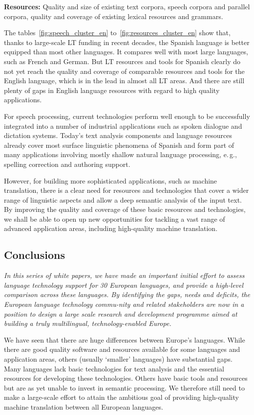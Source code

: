 \begin{multicols}{2}
\textbf{Resources:} Quality and size of existing text corpora, speech corpora and parallel corpora, quality and coverage of existing lexical resources and grammars.

The tables~\ref{fig:speech_cluster_en} to~\ref{fig:resources_cluster_en} show that, thanks to large-scale LT funding in recent decades, the Spanish language is better equipped than most other languages. It compares well with most large languages, such as French and German. But LT resources and tools for Spanish clearly do not yet reach the quality and coverage of comparable resources and tools for the English language, which is in the lead in almost all LT areas. And there are still plenty of gaps in English language resources with regard to high quality applications.

For speech processing, current technologies perform well enough to be successfully integrated into a number of industrial applications such as spoken dialogue and dictation systems. Today’s text analysis components and language resources already cover most surface linguistic phenomena of Spanish and form part of many applications involving mostly shallow natural language processing, e.\,g., spelling correction and authoring support.

However, for building more sophisticated applications, such as machine translation, there is a clear need for resources and technologies that cover a wider range of linguistic aspects and allow a deep semantic analysis of the input text. By improving the quality and coverage of these basic resources and technologies, we shall be able to open up new opportunities for tackling a vast range of advanced application areas, including high-quality machine translation.

\subsection{Conclusions}

\emph{In this series of white papers, we have made an important initial effort to assess language technology support for 30 European languages, and provide a high-level comparison across these languages. By identifying the gaps, needs and deficits, the European language technology commu-nity and related stakeholders are now in a position to design a large scale research and development programme aimed at building a truly multilingual, technology-enabled Europe.}

We have seen that there are huge differences between Europe’s languages. While there are good quality software and resources available for some languages and application areas, others (usually ‘smaller’ languages) have substantial gaps. Many languages lack basic technologies for text analysis and the essential resources for developing these technologies. Others have basic tools and resources but are as yet unable to invest in semantic processing. We therefore still need to make a large-scale effort to attain the ambitious goal of providing high-quality machine translation between all European languages.  


\end{multicols}
